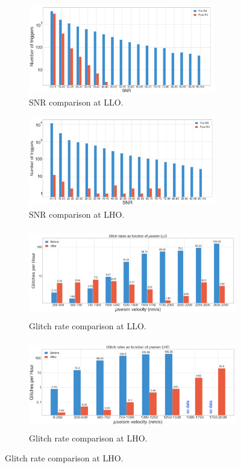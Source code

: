 \documentclass[12pt]{iopart}
\begin{document}
\par
\begin{figure}[h]
\captionsetup[subfigure]{font=scriptsize,labelfont=scriptsize}
   \centering
    \begin{subfigure}[b]{0.45\textwidth}
        \centering
         \includegraphics[width= \textwidth,height=3.9cm]{snr_preandpostLLO.png}
         \caption{SNR comparison at LLO.}
         \label{fig:snr_r0LLO}
    \end{subfigure}
    \hfill
    \begin{subfigure}[b]{0.45\textwidth}
        \centering
         \includegraphics[width =\textwidth,height=3.9cm]{snr_preandpostLHO.png}
         \caption{SNR comparison  at LHO.}
         \label{fig:snr_r0LHO}
    \end{subfigure}
    \par\bigskip
    \begin{subfigure}[b]{0.45\textwidth}
        \centering
         \includegraphics[width= \textwidth,height=3.9cm]{glitch_rateLLO.png}
         \caption{Glitch rate comparison at LLO.}
         
         \label{fig:rate_LLO}
    \end{subfigure}
    \hfill
    \begin{subfigure}[b]{0.45\textwidth}
        \centering
         \includegraphics[width =\textwidth,height=3.9cm]{glitch_rateLHO.png}
         \caption{Glitch rate comparison at LHO.}
         \label{fig:rate_LHO}
    \end{subfigure}
    

\end{figure}
\end{document}
